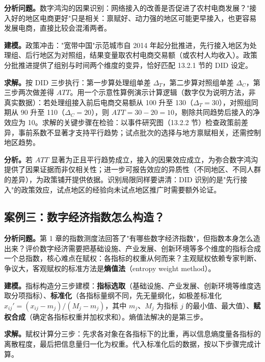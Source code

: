 \textbf{分析问题。}数字鸿沟的因果识别：网络接入的改善是否促进了农村电商发展？"接入好的地区电商更好"只是相关：禀赋好、动力强的地区可能更早接入，也更容易发展电商，直接比较会混淆两者。

\textbf{建模。}政策冲击："宽带中国"示范城市自 2014 年起分批推进，先行接入地区为处理组、后行地区为对照组，结果变量取农村电商交易额（或农村人均收入）。政策分批推进提供了组别与时间两个维度的变异，恰好匹配 13.2.1 节的 DID 设定。

\textbf{求解。}按 DID 三步执行：第一步算处理组单差 $\Delta_T$，第二步算对照组单差 $\Delta_C$，第三步两次做差得 $ATT$。用一个示意性算例演示计算逻辑（数字仅为说明方法，非真实数据）：若处理组接入前后电商交易额从 100 升至 130（$\Delta_T = 30$），对照组同期从 90 升至 110（$\Delta_C = 20$），则 $ATT = 30 - 20 = 10$，剔除共同趋势后接入的净效应为 10。求解的关键步骤在检验：以事件研究图（13.2.2 节）检查政策前差异，事前系数不显著才支持平行趋势；试点批次的选择与地方禀赋相关，还需控制地区趋势。

\textbf{分析。}若 $ATT$ 显著为正且平行趋势成立，接入的因果效应成立，为弥合数字鸿沟提供了因果证据而非仅相关性；进一步可报告效应的异质性（不同地区、不同人群的差异），为政策铺开提供依据。识别局限同样要讲清：DID 识别的是"先行接入"的政策效应，试点地区的经验向未试点地区推广时需要额外论证。

\subsection{案例三：数字经济指数怎么构造？}

\textbf{分析问题。}第 1 章的指数测度法回答了"有哪些数字经济指数"，但指数本身怎么造出来？评价数字经济需要把基础设施、产业发展、创新环境等多个维度的指标合成一个总指数，核心难点在赋权：各指标的权重从何而来？主观赋权依赖专家判断、争议大，客观赋权的标准方法是\textbf{熵值法}（entropy weight method）。

\textbf{建模。}指标构造分三步建模：\textbf{指标选取}（基础设施、产业发展、创新环境等维度选取分项指标）、\textbf{标准化}（各指标量纲不同，先无量纲化，如极差标准化 $x_{ij}' = (x_{ij} - m_j)/(M_j - m_j)$，其中 $m_j$、$M_j$ 为指标 $j$ 的最小值、最大值）、\textbf{赋权合成}（确定各指标权重并加权求和）。熵值法解决的是第三步。

\textbf{求解。}赋权计算分三步：先求各对象在各指标下的比重，再以信息熵度量各指标的离散程度，最后把信息量归一化为权重。代入标准化后的数据，按以下步骤完成计算。

